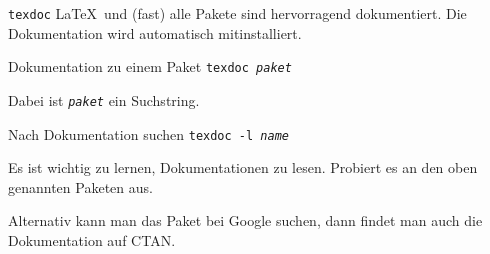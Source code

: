 \begin{frame}{\texttt{texdoc}}
  \LaTeX\ und (fast) alle Pakete sind hervorragend dokumentiert. Die Dokumentation wird automatisch mitinstalliert.
  \begin{block}{Dokumentation zu einem Paket}
    \texttt{texdoc \textit{paket}}
  \end{block}

  Dabei ist \texttt{\textit{paket}} ein Suchstring.
  \begin{block}{Nach Dokumentation suchen}
    \texttt{texdoc -l \textit{name}}
  \end{block}

  Es ist wichtig zu lernen, Dokumentationen zu lesen. Probiert es an den oben genannten Paketen aus.

  \vspace{10pt}
  Alternativ kann man das Paket bei Google suchen, dann findet man auch die Dokumentation auf CTAN.
\end{frame}
